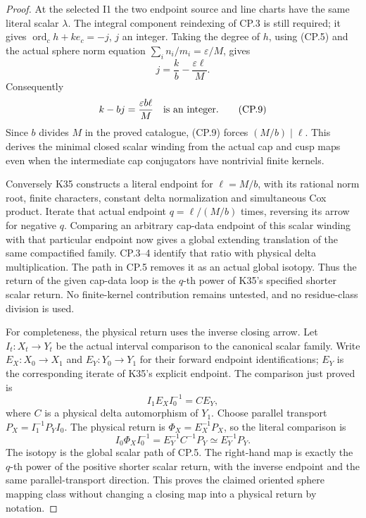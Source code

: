\begin{proof}
At the selected I1 the two endpoint source and line charts have the
same literal scalar \(\lambda\). The integral component reindexing of
CP.3 is still required; it gives
\(\operatorname{ord}_c h+ke_c=-j\), \(j\) an integer. Taking the degree
of \(h\), using (CP.5) and the actual sphere norm equation
\(\sum_i n_i/m_i=\varepsilon/M\), gives
\[
                 j=\frac{k}{b}-\frac{\varepsilon\ell}{M}.
                                                               \tag{CP.8}
\]
Consequently
\[
                  k-bj=\frac{\varepsilon b\ell}{M}
                          \quad\hbox{is an integer}.           \tag{CP.9}
\]
Since \(b\) divides \(M\) in the proved catalogue, (CP.9) forces
\((M/b)\mid\ell\). This derives the minimal closed scalar winding
from the actual cap and cusp maps even when the intermediate cap
conjugators have nontrivial finite kernels.

Conversely K35 constructs a literal endpoint for \(\ell=M/b\),
with its rational norm root, finite characters, constant delta
normalization and simultaneous Cox product. Iterate that actual
endpoint \(q=\ell/(M/b)\) times, reversing its arrow for negative
\(q\). Comparing an arbitrary cap-data endpoint of this scalar winding
with that particular endpoint now gives a global extending
translation of the same compactified family. CP.3--4 identify that
ratio with physical delta multiplication. The path in CP.5 removes
it as an actual global isotopy. Thus the return of the given
cap-data loop is the \(q\)-th power of K35's specified shorter scalar
return. No finite-kernel contribution remains untested, and no
residue-class division is used.

For completeness, the physical return uses the inverse closing
arrow. Let \(I_t:X_t\to Y_t\) be the actual interval comparison to
the canonical scalar family. Write \(E_X:X_0\to X_1\) and
\(E_Y:Y_0\to Y_1\) for their forward endpoint identifications;
\(E_Y\) is the corresponding iterate of K35's explicit endpoint.
The comparison just proved is
\[
             I_1E_XI_0^{-1}=C E_Y,                         \tag{CP.10}
\]
where \(C\) is a physical delta automorphism of \(Y_1\). Choose
parallel transport \(P_X=I_1^{-1}P_YI_0\). The physical return
is \(\Phi_X=E_X^{-1}P_X\), so the literal comparison is
\[
 I_0\Phi_XI_0^{-1}=E_Y^{-1}C^{-1}P_Y
                    \simeq E_Y^{-1}P_Y.                  \tag{CP.11}
\]
The isotopy is the global scalar path of CP.5. The right-hand map
is exactly the \(q\)-th power of the positive shorter scalar
return, with the inverse endpoint and the same parallel-transport
direction. This proves the claimed oriented sphere mapping class
without changing a closing map into a physical return by notation.


\end{proof}
